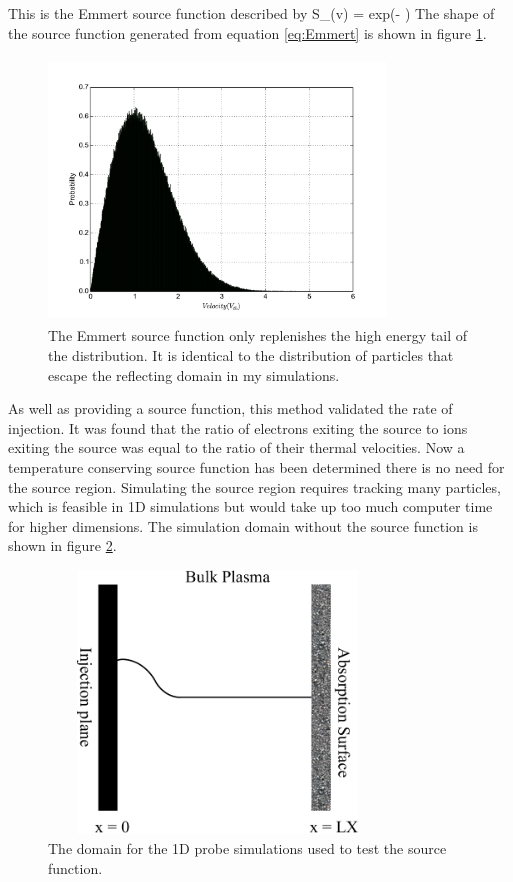 This is the Emmert source function \cite{Emmert} described by
\be
S_(v) =  exp\left(- \right)
\label{eq:Emmert}
\ee
The shape of the source function generated from equation \ref{eq:Emmert} is shown in figure \ref{fig:Emmert}.
\begin{figure}[H]
\centering
\includegraphics[height=7cm,width=0.8\textwidth]{emmert_source.pdf}
\caption{The Emmert source function only replenishes the high energy tail of the distribution. It is identical to the distribution of particles that escape the reflecting domain in my simulations.}
\label{fig:Emmert}
\end{figure}
As well as providing a source function, this method validated the rate of injection. It was found that the ratio of electrons exiting the source to ions exiting the source was equal to the ratio of their thermal velocities. Now a temperature conserving source function has been determined there is no need for the source region. Simulating the source region requires tracking many particles, which is feasible in 1D simulations but would take up too much computer time for higher dimensions. The simulation domain without the source function is shown in figure  \ref{fig:emmert_domain}.
\begin{figure}[H]
\centering
\includegraphics[height=7cm,width=0.8\textwidth]{ideal_probe_test.pdf}
\caption{The domain for the 1D probe simulations used to test the source function.}
\label{fig:emmert_domain}
\end{figure}




